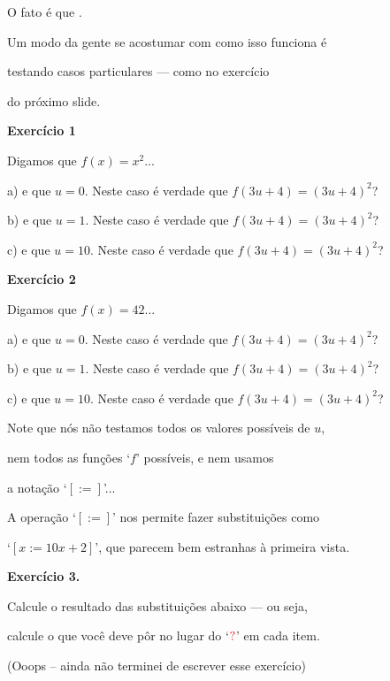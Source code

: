 \documentclass[oneside,12pt]{article}
\begin{document}
O fato é que .

Um modo da gente se acostumar com como isso funciona é

testando  casos particulares --- como no exercício

do próximo slide.

\newpage


{\bf Exercício 1}

Digamos que $f(x)=x^2$...

a) e que $u=0$. Neste caso é verdade que $f(3u+4) = (3u+4)^2$?

b) e que $u=1$. Neste caso é verdade que $f(3u+4) = (3u+4)^2$?

c) e que $u=10$. Neste caso é verdade que $f(3u+4) = (3u+4)^2$?

\msk

{\bf Exercício 2}

Digamos que $f(x)=42$...

a) e que $u=0$. Neste caso é verdade que $f(3u+4) = (3u+4)^2$?

b) e que $u=1$. Neste caso é verdade que $f(3u+4) = (3u+4)^2$?

c) e que $u=10$. Neste caso é verdade que $f(3u+4) = (3u+4)^2$?

\bsk

Note que nós não testamos todos os valores possíveis de $u$,

nem todos as funções `$f$' possíveis, e nem usamos

a notação `$[:=]$'...

\newpage

A operação `$[:=]$' nos permite fazer substituições como

`$[x:=10x+2]$', que parecem bem estranhas à primeira vista.

\bsk

{\bf Exercício 3.}

Calcule o resultado das substituições abaixo --- ou seja,

calcule o que você deve pôr no lugar do `$\ColorRed{?}$' em cada item.

\bsk

(Ooops -- ainda não terminei de escrever esse exercício)

\newpage

%                                                        
\end{document}
